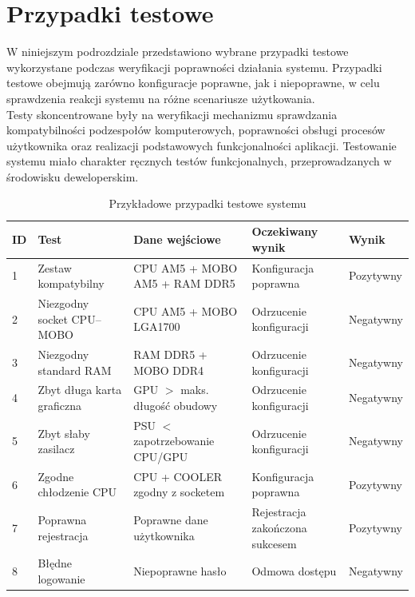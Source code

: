 \documentclass[a4paper,twoside,12pt]{book}
\begin{document}
\section{Przypadki testowe}
W niniejszym podrozdziale przedstawiono wybrane przypadki testowe wykorzystane
podczas weryfikacji poprawności działania systemu. Przypadki testowe obejmują
zarówno konfiguracje poprawne, jak i niepoprawne, w celu sprawdzenia reakcji
systemu na różne scenariusze użytkowania.
\vspace{0.5cm}
\\
Testy skoncentrowane były na weryfikacji mechanizmu sprawdzania kompatybilności
podzespołów komputerowych, poprawności obsługi procesów użytkownika oraz realizacji
podstawowych funkcjonalności aplikacji. Testowanie systemu miało charakter ręcznych
testów funkcjonalnych, przeprowadzanych w środowisku deweloperskim.


\begin{table}[H]
\centering
\caption{Przykładowe przypadki testowe systemu}
\label{tab:przypadki_testowe}
\begin{tabular}{|p{0.8cm}|p{2.8cm}|p{4.0cm}|p{3.6cm}|p{2.6cm}|}
\hline
ID & Test & Dane wejściowe & Oczekiwany wynik & Wynik \\
\hline
1 & Zestaw kompatybilny &
CPU AM5 + MOBO AM5 + RAM DDR5 &
Konfiguracja poprawna &
Pozytywny \\
\hline
2 & Niezgodny socket CPU--MOBO &
CPU AM5 + MOBO LGA1700 &
Odrzucenie konfiguracji &
Negatywny \\
\hline
3 & Niezgodny standard RAM &
RAM DDR5 + MOBO DDR4 &
Odrzucenie konfiguracji &
Negatywny \\
\hline
4 & Zbyt długa karta graficzna &
GPU $>$ maks. długość obudowy &
Odrzucenie konfiguracji &
Negatywny \\
\hline
5 & Zbyt słaby zasilacz &
PSU $<$ zapotrzebowanie CPU/GPU &
Odrzucenie konfiguracji &
Negatywny \\
\hline
6 & Zgodne chłodzenie CPU &
CPU + COOLER zgodny z socketem &
Konfiguracja poprawna &
Pozytywny \\
\hline
7 & Poprawna rejestracja &
Poprawne dane użytkownika &
Rejestracja zakończona sukcesem &
Pozytywny \\
\hline
8 & Błędne logowanie &
Niepoprawne hasło &
Odmowa dostępu &
Negatywny \\
\hline
\end{tabular}
\end{table}
\end{document}
